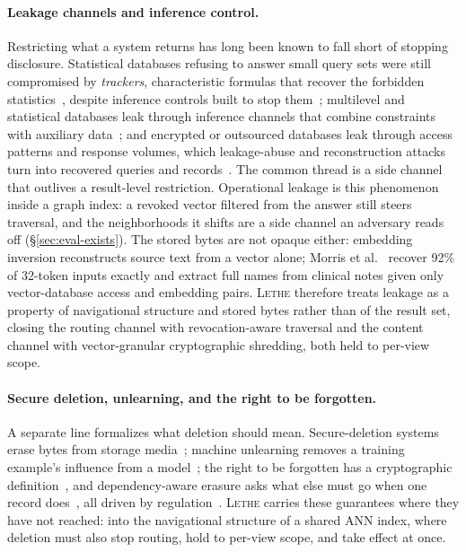 \documentclass[sigconf, nonacm, review]{acmart}
\begin{document}
\paragraph{Leakage channels and inference control.}
Restricting what a system returns has long been known to fall short of stopping
disclosure. Statistical databases refusing to answer small query sets were
still compromised by \emph{trackers}, characteristic formulas that recover the
forbidden statistics~\cite{DBLP:journals/tods/DenningDS79,DBLP:journals/tods/DenningS80},
despite inference controls built to stop them~\cite{DBLP:journals/tods/Denning80};
multilevel and statistical databases leak through inference channels that
combine constraints with auxiliary
data~\cite{JajodiaMeadows95,DBLP:journals/sigkdd/FarkasJ02,DBLP:journals/tkde/BrodskyFJ00,DBLP:journals/tse/ChinO82};
and encrypted or outsourced databases leak through access patterns and
response volumes, which leakage-abuse and reconstruction attacks turn into
recovered queries and
records~\cite{DBLP:conf/ndss/IslamKK12,DBLP:conf/ccs/CashGPR15,DBLP:conf/ccs/NaveedKW15,DBLP:conf/ccs/KellarisKNO16,DBLP:conf/ccs/GrubbsLMP18,DBLP:conf/sp/GrubbsLMP19}.
The common thread is a side channel that outlives a result-level restriction.
Operational leakage is this phenomenon inside a graph index: a revoked vector
filtered from the answer still steers traversal, and the neighborhoods it shifts
are a side channel an adversary reads off (\S\ref{sec:eval-exists}). The stored bytes are not opaque either: embedding inversion
reconstructs source text from a vector alone; Morris et
al.~\cite{DBLP:conf/emnlp/MorrisKSR23} recover 92\% of 32-token inputs exactly
and extract full names from clinical notes given only vector-database access and
embedding pairs. \textsc{Lethe} therefore treats leakage as a property of
navigational structure and stored bytes rather than of the result set, closing
the routing channel with revocation-aware traversal and the content channel with
vector-granular cryptographic shredding, both held to per-view scope.

\paragraph{Secure deletion, unlearning, and the right to be forgotten.}
A separate line formalizes what deletion should mean. Secure-deletion systems
erase bytes from storage media~\cite{DBLP:conf/sp/ReardonBC13}; machine
unlearning removes a training example's influence from a
model~\cite{DBLP:conf/sp/CaoY15,DBLP:conf/sp/BourtouleCCJTZL21,DBLP:conf/nips/GinartGVZ19};
the right to be forgotten has a cryptographic
definition~\cite{DBLP:conf/eurocrypt/GargGV20}, and dependency-aware erasure
asks what else must go when one record
does~\cite{DBLP:journals/pvldb/ChakrabortyKMNNPSV25}, all driven by
regulation~\cite{GDPR16}. \textsc{Lethe} carries these guarantees where they
have not reached: into the navigational structure of a shared ANN index,
where deletion must also stop routing, hold to per-view scope, and take
effect at once.
\end{document}
